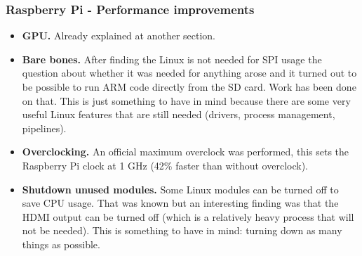 
\subsubsection{Raspberry Pi - Performance improvements}

\begin{itemize}
\item \textbf{GPU.} Already explained at another section. 
\item \textbf{Bare bones.} After finding the Linux is not needed for SPI usage the question about whether it was needed for anything arose and it turned out to be possible to run ARM code directly from the SD card. Work has been done on that. This is just something to have in mind because there are some very useful Linux features that are still needed (drivers, process management, pipelines).
\item \textbf{Overclocking.} An official maximum overclock was performed, this sets the Raspberry Pi clock at 1 GHz (42\% faster than without overclock).
\item \textbf{Shutdown unused modules.} Some Linux modules can be turned off to save CPU usage. That was known but an interesting finding was that the HDMI output can be turned off (which is a relatively heavy process that will not be needed). This is something to have in mind: turning down as many things as possible.
\end{itemize}
